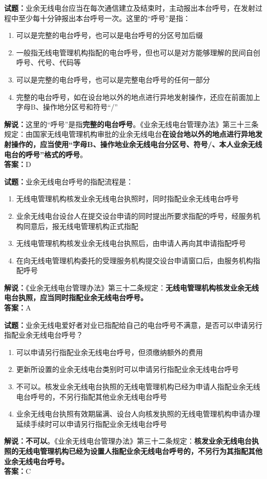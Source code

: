 \documentclass{ctexbook}
\begin{document}
\bigskip

\noindent\textbf{试题：}业余无线电台应当在每次通信建立及结束时，主动报出本台呼号，在发射过程中至少每十分钟报出本台呼号一次。这里的“呼号”是指：
\begin{enumerate}[leftmargin=3em]
  \item 可以是完整的电台呼号，也可以是电台呼号的分区号加后缀
  \item 一般指无线电管理机构指配的电台呼号，但也可以是对方能够理解的民间自创呼号、代号、代码等
  \item 可以是完整的电台呼号，也可以是完整电台呼号的任何一部分
  \item 完整的电台呼号，如在设台地以外的地点进行异地发射操作，还应在前面加上字母B、操作地分区号和符号“/”
\end{enumerate}
\noindent\textbf{解说：}这里的“呼号”是指\textbf{完整的电台呼号}。《业余无线电台管理办法》第三十三条规定：由国家无线电管理机构审批的业余无线电台\textbf{在设台地以外的地点进行异地发射操作的，应当使用“字母B、操作地业余无线电台分区号、符号/、本人业余无线电台的呼号”格式的呼号}。\\\noindent\textbf{答案：}D

\bigskip

\noindent\textbf{试题：}业余无线电台呼号的指配流程是：
\begin{enumerate}[leftmargin=3em]
  \item 无线电管理机构核发业余无线电台执照时，同时指配业余无线电台呼号
  \item 业余无线电台设台人在提交设台申请的同时提出所要求指配的呼号，经服务机构同意后，报无线电管理机构正式指配
  \item 无线电管理机构核发业余无线电台执照后，由申请人再向其申请指配呼号
  \item 在向无线电管理机构委托的受理服务机构提交设台申请窗口后，由服务机构指配呼号
\end{enumerate}
\noindent\textbf{解说：}《业余无线电台管理办法》第三十二条规定：\textbf{无线电管理机构核发业余无线电台执照，应当同时指配业余无线电台呼号。}\\\noindent\textbf{答案：}A

\bigskip

\noindent\textbf{试题：}业余无线电爱好者对业已指配给自己的电台呼号不满意，是否可以申请另行指配业余无线电台呼号？
\begin{enumerate}[leftmargin=3em]
  \item 可以申请另行指配业余无线电台呼号，但须缴纳额外的费用
  \item 更新所设置的业余无线电台类别时可以申请另行指配业余无线电台呼号
  \item 不可以。核发业余无线电台执照的无线电管理机构已经为申请人指配业余无线电台呼号的，不另行指配其他业余无线电台呼号
  \item 业余无线电台执照有效期届满、设台人向核发执照的无线电管理机构申请办理延续手续时可以申请另行指配业余无线电台呼号
\end{enumerate}
\textbf{解说：不可以}。《业余无线电台管理办法》第三十二条规定：\textbf{核发业余无线电台执照的无线电管理机构已经为设置人指配业余无线电台呼号的，不另行为其指配其他业余无线电台呼号。}\\\noindent\textbf{答案：}C
\end{document}
